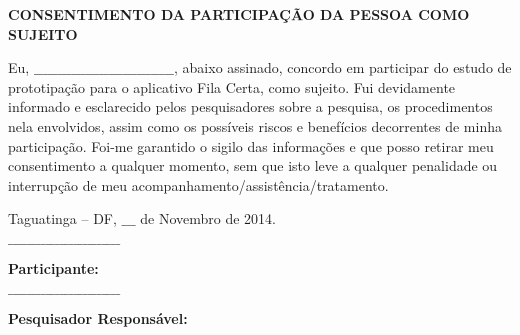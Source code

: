 		\begin{center}
			\textbf{CONSENTIMENTO DA PARTICIPAÇÃO DA PESSOA COMO SUJEITO}
		\end{center}

		Eu, $\_\_\_\_\_\_\_\_\_\_\_\_\_\_\_\_\_\_\_\_\_\_\_\_\_\_\_\_\_\_$, abaixo assinado, concordo em participar do estudo de prototipação para o aplicativo Fila Certa, como sujeito. Fui devidamente informado e esclarecido pelos pesquisadores sobre a pesquisa, os procedimentos nela envolvidos, assim como os possíveis riscos e benefícios decorrentes de minha participação. Foi-me garantido o sigilo das informações e que posso retirar meu consentimento a qualquer momento, sem que isto leve a qualquer penalidade ou interrupção de meu acompanhamento/assistência/tratamento. 

		{\flushright  Taguatinga – DF, $\_\_\_$ de Novembro de 2014.}

		\begin{center}
			$\_\_\_\_\_\_\_\_\_\_\_\_\_\_\_\_\_\_\_\_\_\_\_\_$
			
			\textbf{Participante:}

			$\_\_\_\_\_\_\_\_\_\_\_\_\_\_\_\_\_\_\_\_\_\_\_\_$
			
			\textbf{Pesquisador Responsável:}
		\end{center}